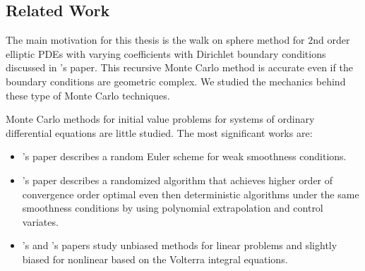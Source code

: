 \documentclass[a4paper,12pt]{article}
\begin{document}
\subsection{Related Work}
The main motivation for this thesis is the walk on sphere method for $2$nd order elliptic PDEs
with varying coefficients with Dirichlet boundary conditions
discussed in \citeauthor{sawhney_grid-free_2022}'s
\citeyear{sawhney_grid-free_2022} \cite{sawhney_grid-free_2022} paper.
This recursive Monte Carlo method
is accurate even if the boundary conditions are geometric complex. We studied the
mechanics behind these type of Monte Carlo techniques.

\begin{related}
    Monte Carlo methods for initial value problems for systems of ordinary
    differential equations are little studied. The most significant works are:
    \begin{itemize}
        \item \citeauthor{jentzen_random_2009}'s \citeyear{jentzen_random_2009}
              \cite{jentzen_random_2009} paper describes a random Euler scheme for
              weak smoothness conditions.

        \item \citeauthor{daun_randomized_2011}'s \citeyear{daun_randomized_2011}
              \cite{daun_randomized_2011} paper describes a randomized algorithm that
              achieves higher order of convergence order optimal even
              then deterministic algorithms under the
              same smoothness conditions by using polynomial extrapolation and
              control variates.

        \item \citeauthor{ermakov_monte_2019}'s \citeyear{ermakov_monte_2019}
              \cite{ermakov_monte_2019}
              and \citeauthor{ermakov_monte_2021}'s \citeyear{ermakov_monte_2021}
              \cite{ermakov_monte_2021}
              papers study unbiased  methods
              for linear problems and slightly biased for nonlinear based
              on the Volterra integral equations.

    \end{itemize}



\end{related}
\end{document}
